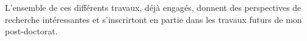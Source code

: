 %

%
%


\bigskip

L'ensemble de ces différents travaux, déjà engagés, donnent des perspectives de recherche
intéressantes et s'inscrirtont en partie dans les travaux futurs de mon post-doctorat.
